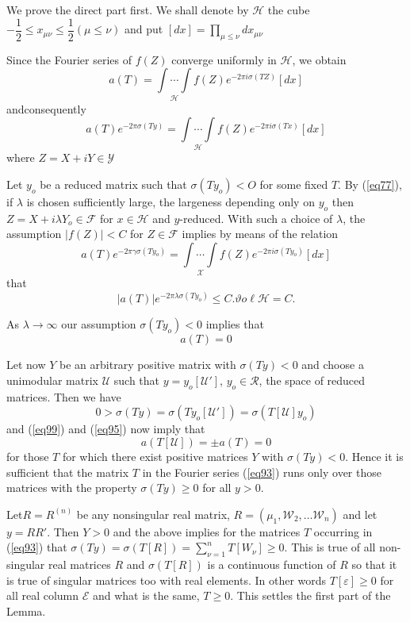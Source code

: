 We prove the direct part first. We shall denote by $\mathcal{H}$ the
cube $- \dfrac{1}{2}\le x_{\mu \nu} \le \dfrac{1}{2} (\mu
\le \nu)$ \qquad and put $[dx]= \prod\limits_{\mu \le \nu} dx_{\mu
  \nu}$ 

Since the Fourier series of $f(Z)$ converge uniformly in
$\mathcal{H}$, we obtain 
$$
a (T)= {\underset{\mathcal{H}} {\int \cdots \int}} f(Z)e^{-2 \pi
  i \sigma (TZ)} [d x] 
$$ 
and\pageoriginale consequently
$$
a(T) e^{-2 \pi  \sigma (Ty)}={\underset{\mathcal{H}} {\int \cdots \int}}f
(Z)e^{-2 \pi i \sigma (Tx)} [dx] 
$$
where $Z= X+iY \in \mathscr{Y}$

Let $y_o$ be a reduced matrix such that $\sigma (Ty_o)<O$ for some
fixed $T$.  By (\ref{eq77}), if $\lambda$ is chosen sufficiently large, the
largeness depending only on $y_o$ then $Z=X+ i \lambda Y_o \in
\mathcal{F}$ for $x \in \mathcal{H}$ and $y$-reduced. With such a
choice of $\lambda$, the assumption $|f(Z)| < C$ for $Z \in
\mathcal{F}$ implies by means of the relation 
$$
a (T)e^{-2 \pi \gamma \sigma (Ty_o)}={\underset{\mathscr{X}} {\int
    \cdots \int}} f(Z)e^{-2 \pi i \sigma (Ty_o)} [dx] 
$$
that
$$
|a (T)|e^{-2 \pi \lambda \sigma (Ty_o)} \le C.\vartheta o \ell
\mathcal{H}=C. 
$$

As $\lambda \to \infty$ our assumption $\sigma (Ty_o)<0$ implies that  
\begin{equation*}
a(T)=0 \tag{99}\label{eq99}
\end{equation*}

Let now $Y$ be an arbitrary positive matrix with $\sigma (Ty)<0$ and
choose a unimodular matrix $\mathcal{U}$ such that $y=y_o
[\mathcal{U'}]$, $y_o \in \mathscr{R}$, the space of reduced
matrices. Then we have 
$$
0> \sigma (T y)= \sigma (Ty_o[\mathcal{U'}])= \sigma
(T[\mathcal{U}]y_o) 
$$
and (\ref{eq99}) and (\ref{eq95}) now imply that 
$$
a (T[\mathcal{U}])= \pm a (T)=0 
$$
for those $T$ for which there exist positive matrices $Y$ with
$\sigma(Ty)<0$. Hence it is sufficient that the matrix $T$ in the Fourier
series (\ref{eq93}) runs only over those matrices with the property $\sigma
(T y)\ge 0$ for all $y >0$. 

Let\pageoriginale $R=R^{(n)}$ be any nonsingular real matrix, $R=
(\mu_1,\mathscr{W}_2, \ldots \mathscr{W}_n)$ and let $y=R  R'$. Then
$Y>0$ and the above implies for the matrices $T$ occurring in (\ref{eq93})
that $\sigma (T y)= \sigma (T[R])= \sum^n_{\nu =1} T [W_\nu]\ge 0$. This is
true of all non-singular real matrices $R$ and $\sigma (T[R])$ is a
continuous function of $R$ so that it is true of singular matrices too
with real elements. In other words $T[\varepsilon]\ge 0$ for all real
column $\mathscr{E}$ and what is the same, $T\ge 0$. This settles the
first part of the Lemma. 

